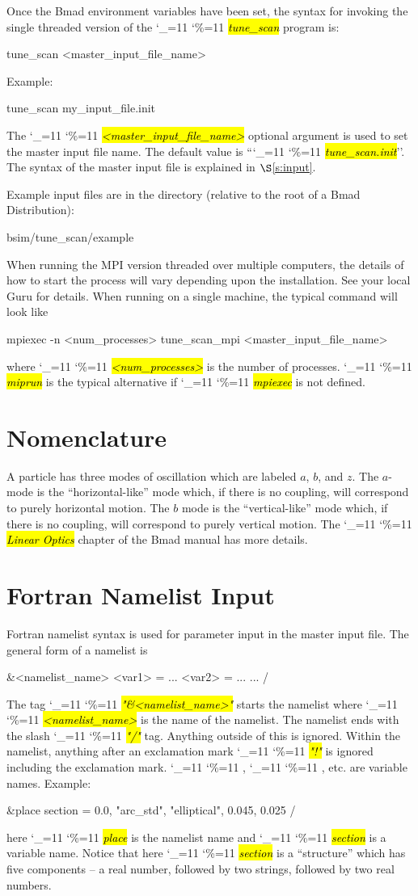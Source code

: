 \documentclass{hitec}
\newcommand\dottcmd[1]{\hl{\em#1}\endgroup}
\newcommand{\vn}{\begingroup\catcode`\_=11 \catcode`\%=11 \dottcmd}
\newcommand{\ts}{\vn{tune_scan}\xspace}
\newcommand{\sref}[1]{$\S$\ref{#1}}
\newcommand{\Section}[1]{\section{#1}\vspace*{-1ex}}
\begin{document}
Once the Bmad environment variables have been set, the syntax for invoking the single threaded
version of the \ts program is:
\begin{code}
tune_scan {<master_input_file_name>}
\end{code}
Example:
\begin{code}
tune_scan my_input_file.init
\end{code}
The \vn{<master_input_file_name>} optional argument is used to set the master input file name. The
default value is ``\vn{tune_scan.init}''. The syntax of the master input file is explained
in \sref{s:input}.

Example input files are in the directory (relative to the root of a Bmad Distribution):
\begin{code}
bsim/tune_scan/example
\end{code}

When running the MPI version threaded over multiple computers, the details of how to start the process will
vary depending upon the installation. See your local Guru for details. When running on a single machine, 
the typical command will look like
\begin{code}
mpiexec -n <num_processes> tune_scan_mpi {<master_input_file_name>}
\end{code}
where \vn{<num_processes>} is the number of processes. \vn{miprun} is the typical alternative if
\vn{mpiexec} is not defined.

\Section{Nomenclature}
\label{s:nomen}

A particle has three modes of oscillation which are labeled $a$, $b$, and $z$. The $a$-mode is the
``horizontal-like'' mode which, if there is no coupling, will correspond to purely horizontal
motion.  The $b$ mode is the ``vertical-like'' mode which, if there is no coupling, will correspond
to purely vertical motion. The \vn{Linear Optics} chapter of the Bmad manual has more details.

\Section{Fortran Namelist Input}
\label{s:namelist}

Fortran namelist syntax is used for parameter input in the master input file. The general form of a namelist is
\begin{code}
&<namelist_name>
  <var1> = ...
  <var2> = ...
  ...
/
\end{code}
The tag \vn{"\&<namelist_name>"} starts the namelist where
\vn{<namelist_name>} is the name of the namelist. The namelist ends
with the slash \vn{"/"} tag. Anything outside of this is
ignored. Within the namelist, anything after an exclamation mark
\vn{"!"} is ignored including the exclamation mark. \vn{<var1>},
\vn{<var2>}, etc. are variable names. Example:
\begin{code}
&place 
  section = 0.0, "arc_std", "elliptical", 0.045, 0.025 
/
\end{code}
here \vn{place} is the namelist name and \vn{section} is a
variable name.  Notice that here \vn{section} is a ``structure'' which
has five components -- a real number, followed by two strings,
followed by two real numbers.
\end{document}
